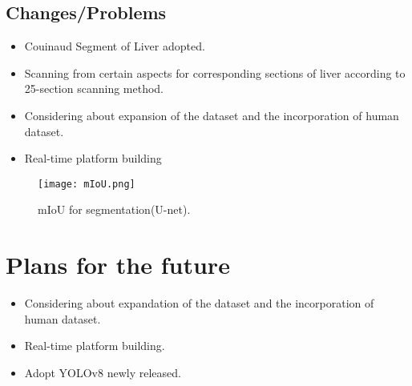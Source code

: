 \documentclass[12pt, a4paper]{article}
\begin{document}


\subsection{Changes/Problems}

\begin{itemize}
	\item Couinaud Segment of Liver adopted.
	\item Scanning from certain aspects for corresponding sections of liver according to 25-section scanning method.
	\item Considering about expansion of the dataset and the incorporation of human dataset.
	\item Real-time platform building
\end{itemize}
\begin{figure}[tbh]
	\centering
	\texttt{[image: mIoU.png]}
	\vspace*{-1mm}
	\caption{mIoU for segmentation(U-net).}
	\label{fig: fig1}
\end{figure}
\section{Plans for the future}
\begin{itemize}

	\item Considering about expandation of the dataset and the incorporation of human dataset.
	\item Real-time platform building.
	\item Adopt YOLOv8 newly released.
\end{itemize}
\end{document}

